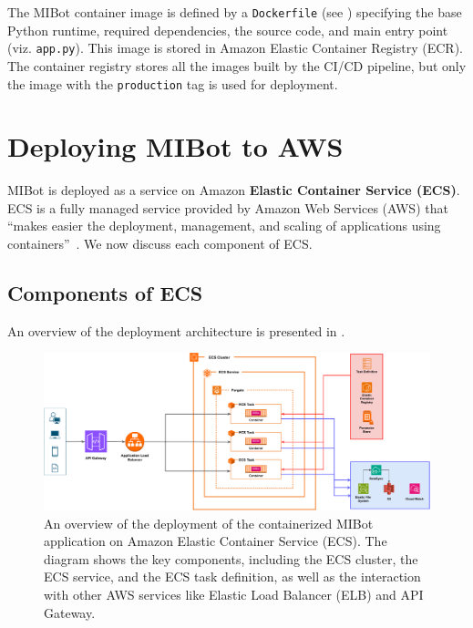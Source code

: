 The MIBot container image is defined by a \texttt{Dockerfile} (see ) specifying the base Python runtime, required dependencies, the source code, and main entry point (viz. \texttt{app.py}). This image is stored in Amazon Elastic Container Registry (ECR). The container registry stores all the images built by the CI/CD pipeline, but only the image with the \texttt{production} tag is used for deployment.

\section{Deploying MIBot to AWS}
\label{sec:mibot-deployment}

MIBot is deployed as a service on Amazon \textbf{Elastic Container Service (ECS)}. ECS is a fully managed service provided by Amazon Web Services (AWS) that ``makes easier the deployment, management, and scaling of applications using containers''~\citep{aws-ecs-getting-started}. We now discuss each component of ECS.

\subsection{Components of ECS}
An overview of the deployment architecture is presented in .
\begin{figure}[ht]
  \centering
  \includegraphics[width=0.99\linewidth]{fig/deployment.drawio.pdf} 
  \caption[MIBot Deployment on AWS ECS]{An overview of the deployment of the containerized MIBot application on Amazon Elastic Container Service (ECS). The diagram shows the key components, including the ECS cluster, the ECS service, and the ECS task definition, as well as the interaction with other AWS services like Elastic Load Balancer (ELB) and API Gateway.}
  \label{fig:ecs-components}
\end{figure}

